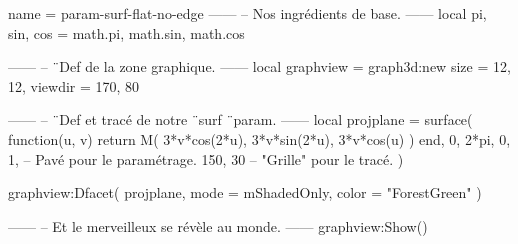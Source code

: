 \documentclass{standalone}
\begin{document}
\begin{luadraw}{name = param-surf-flat-no-edge}
------
-- Nos ingrédients de base.
------
local pi, sin, cos = math.pi, math.sin, math.cos

------
-- ¨Def de la zone graphique.
------
local graphview = graph3d:new{
  size    = {12, 12},
  viewdir = {170, 80}
}

------
-- ¨Def et tracé de notre ¨surf ¨param.
------
local projplane = surface(
  function(u, v)
    return M(
      3*v*cos(2*u),
      3*v*sin(2*u),
      3*v*cos(u)
    )
  end,
  0, 2*pi, 0, 1,  -- Pavé pour le paramétrage.
  {150, 30}       -- "Grille" pour le tracé.
)

graphview:Dfacet(
  projplane,
  {
    mode  = mShadedOnly,
    color = "ForestGreen"
  }
)

------
-- Et le merveilleux se révèle au monde.
------
graphview:Show()
\end{luadraw}
\end{document}
